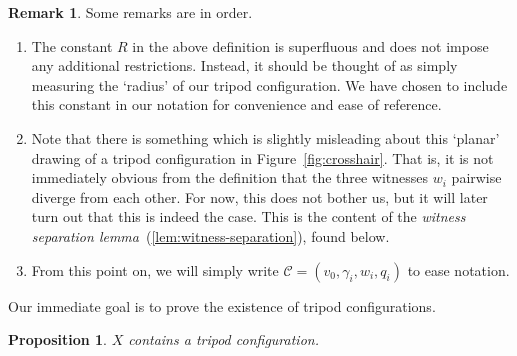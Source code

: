 \documentclass[11pt,a4paper]{amsart}
\newtheorem{proposition}[theorem]{Proposition}
\theoremstyle{definition}
\newtheorem{remark}[theorem]{Remark}
\newcommand{\crosshair}{\mathcal{C}}
\begin{document}
\begin{remark}
    Some remarks are in order.
    \begin{enumerate}
        \item The constant $R$ in the above definition is superfluous and does not impose any additional restrictions. Instead, it should be thought of as simply measuring the `radius' of our tripod configuration. We have chosen to include this constant in our notation for convenience and ease of reference.

        \item Note that there is something which is slightly misleading about this `planar' drawing of a tripod configuration in Figure~\ref{fig:crosshair}. That is, it is not immediately obvious from the definition that the three witnesses $w_i$ pairwise diverge from each other. For now, this does not bother us, but it will later turn out that this is indeed the case. This is the content of the \emph{witness separation lemma}~(\ref{lem:witness-separation}), found below.

        \item From this point on, we will simply write 
        $
        \crosshair = (v_0, \gamma_i,w_i,q_i)
        $
        to ease notation.
    \end{enumerate}
\end{remark}

 

Our immediate goal is to prove the existence of tripod configurations.



\begin{proposition}\label{prop:crosshair-exists}
     $X$ contains a tripod configuration.
\end{proposition}
\end{document}
